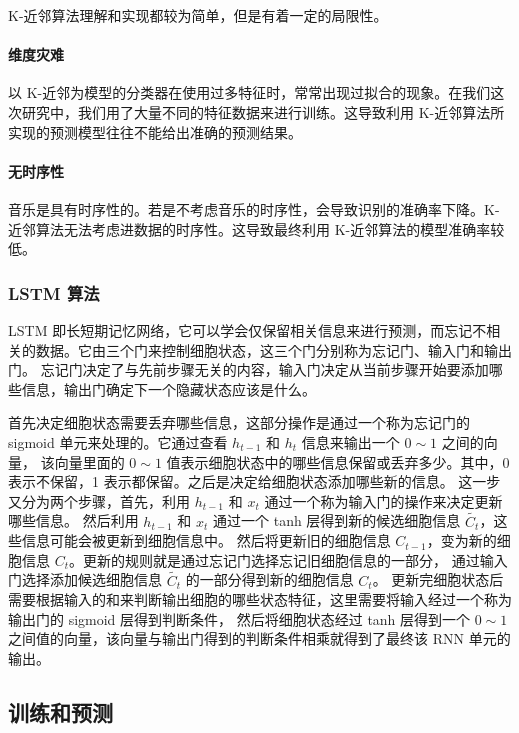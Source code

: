 \documentclass[a4paper,utf8,10pt]{article}
\begin{document}
K-近邻算法理解和实现都较为简单，但是有着一定的局限性。

\paragraph{维度灾难} 以 K-近邻为模型的分类器在使用过多特征时，常常出现过拟合的现象。在我们这次研究中，我们用了大量不同的特征数据来进行训练。这导致利用 K-近邻算法所实现的预测模型往往不能给出准确的预测结果。
\paragraph{无时序性} 音乐是具有时序性的。若是不考虑音乐的时序性，会导致识别的准确率下降。K-近邻算法无法考虑进数据的时序性。这导致最终利用 K-近邻算法的模型准确率较低。

\subsubsection{LSTM 算法}

LSTM 即长短期记忆网络，它可以学会仅保留相关信息来进行预测，而忘记不相关的数据。它由三个门来控制细胞状态，这三个门分别称为忘记门、输入门和输出门。
忘记门决定了与先前步骤无关的内容，输入门决定从当前步骤开始要添加哪些信息，输出门确定下一个隐藏状态应该是什么。

首先决定细胞状态需要丢弃哪些信息，这部分操作是通过一个称为忘记门的 sigmoid 单元来处理的。它通过查看 $h_{t-1}$ 和 $h_t$ 信息来输出一个 $0 \sim 1$ 之间的向量，
该向量里面的 $0 \sim 1$ 值表示细胞状态中的哪些信息保留或丢弃多少。其中，0 表示不保留，1 表示都保留。之后是决定给细胞状态添加哪些新的信息。
这一步又分为两个步骤，首先，利用 $h_{t-1}$ 和 $x_t$ 通过一个称为输入门的操作来决定更新哪些信息。
然后利用 $h_{t-1}$ 和 $x_t$ 通过一个 tanh 层得到新的候选细胞信息 $\tilde{C_t}$，这些信息可能会被更新到细胞信息中。
然后将更新旧的细胞信息 $C_{t-1}$，变为新的细胞信息 $C_t$。更新的规则就是通过忘记门选择忘记旧细胞信息的一部分，
通过输入门选择添加候选细胞信息 $\tilde{C_t}$ 的一部分得到新的细胞信息 $C_t$。
更新完细胞状态后需要根据输入的和来判断输出细胞的哪些状态特征，这里需要将输入经过一个称为输出门的 sigmoid 层得到判断条件，
然后将细胞状态经过 tanh 层得到一个 $0 \sim 1$ 之间值的向量，该向量与输出门得到的判断条件相乘就得到了最终该 RNN 单元的输出。

\subsection{训练和预测}
\end{document}
